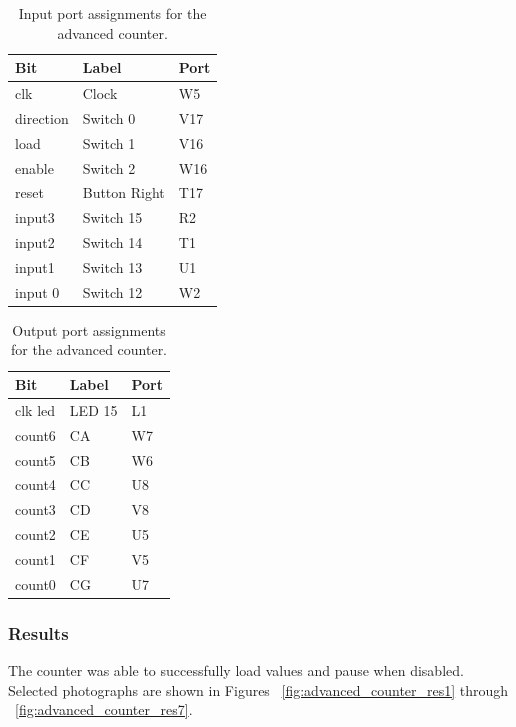 \documentclass[11pt]{article}
\begin{document}
\begin{table}[H]
\begin{center}
\begin{tabular}{| l | l | l |}
	\hline
	Bit & Label & Port \\ \hline
	clk &  Clock & W5 \\ \hline
	direction & Switch 0 & V17 \\ \hline
	load & Switch 1 & V16 \\ \hline
	enable & Switch 2 & W16 \\ \hline
	reset & Button Right & T17 \\ \hline
	input3 & Switch 15 & R2 \\ \hline
	input2 & Switch 14 & T1 \\ \hline
	input1 & Switch 13 & U1 \\ \hline
	input 0 & Switch 12 & W2 \\ \hline
\end{tabular}
\caption{\label{tab:advanced_counter_input_Ports}Input port assignments for  the advanced counter.}
\end{center}
\end{table}

\begin{table}[H]
\begin{center}
\begin{tabular}{| l | l | l |}
	\hline
	Bit & Label & Port \\ \hline
	clk led & LED 15 & L1 \\ \hline
	count6 & CA & W7 \\ \hline
	count5 & CB & W6 \\ \hline
	count4 & CC & U8 \\ \hline
	count3 & CD & V8 \\ \hline
	count2 & CE & U5 \\ \hline
	count1 & CF & V5 \\ \hline
	count0 & CG & U7 \\ \hline
\end{tabular}
\caption{\label{tab:advanced_counter_output_Ports}Output port assignments for the advanced counter.}
\end{center}
\end{table}


\subsubsection{Results}
The counter was able to successfully load values and pause when disabled. Selected photographs are shown in Figures ~\ref{fig:advanced_counter_res1} through ~\ref{fig:advanced_counter_res7}.
\end{document}

